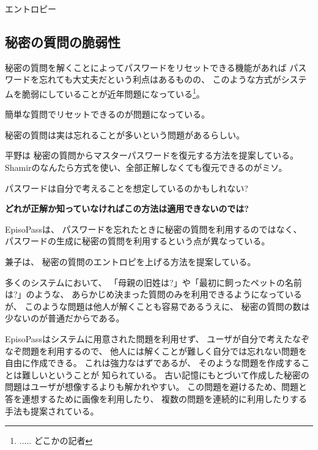 \documentclass[twoside]{wiss}
\begin{document}
エントロピー

\subsection{秘密の質問の脆弱性}

秘密の質問を解くことによってパスワードをリセットできる機能があれば
パスワードを忘れても大丈夫だという利点はあるものの、
このような方式がシステムを脆弱にしていることが近年問題になっている\footnote{
  ..... どこかの記者
}。

簡単な質問でリセットできるのが問題になっている。

秘密の質問は実は忘れることが多いという問題があるらしい。

平野\cite{平野亮:2011-11-07}は
秘密の質問からマスターパスワードを復元する方法を提案している。
Shamirのなんたら方式を使い、全部正解しなくても復元できるのがミソ。

パスワードは自分で考えることを想定しているのかもしれない?

\textbf{どれが正解か知っていなければこの方法は適用できないのでは?}


EpisoPassは、
パスワードを忘れたときに秘密の質問を利用するのではなく、
パスワードの生成に秘密の質問を利用するという点が異なっている。

兼子は、
秘密の質問のエントロピを上げる方法を提案している\cite{Kaneko}。

多くのシステムにおいて、
「母親の旧姓は?」や「最初に飼ったペットの名前は?」のような、
あらかじめ決まった質問のみを利用できるようになっているが、
このような問題は他人が解くことも容易であるうえに、
秘密の質問の数は少ないのが普通だからである\cite{Rabkin:2008:PKQ:1408664.1408667}。

EpisoPassはシステムに用意された問題を利用せず、
ユーザが自分で考えたなぞなぞ問題を利用するので、
他人には解くことが難しく自分では忘れない問題を自由に作成できる。
これは強力なはずであるが、
そのような問題を作成することは難しいということが
知られている\cite{Just:2009:PCC:1572532.1572543}\cite{Schechter:2009:NSM:1607723.1608145}。
%
%
%
古い記憶にもとづいて作成した秘密の問題はユーザが想像するよりも解かれやすい。
この問題を避けるため、問題と答を連想するために画像を利用したり、
複数の問題を連続的に利用したりする手法も提案されている\cite{Renaud:2010:PQE:2146303.2146318}。
\end{document}

